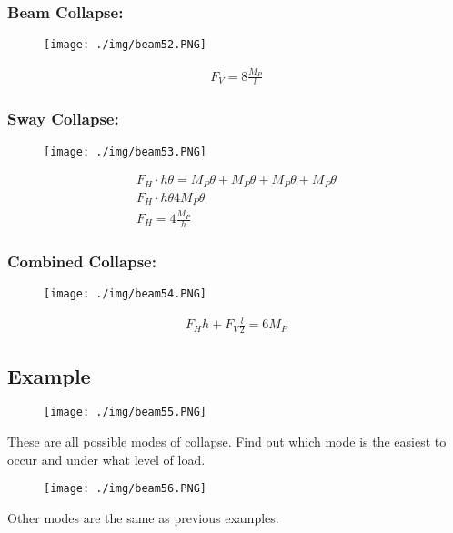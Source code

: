 \subsubsection{Beam Collapse:}
\begin{figure}[H]
  \centering
  \texttt{[image: ./img/beam52.PNG]}
\end{figure}
\begin{gather}
  F_V = 8\frac{M_P}{l}
\end{gather}
\subsubsection{Sway Collapse:}
\begin{figure}[H]
  \centering
  \texttt{[image: ./img/beam53.PNG]}
\end{figure}
\begin{gather}
  F_H \cdot h\theta = M_P\theta + M_P\theta + M_P\theta + M_P\theta \\
  F_H \cdot h\theta 4M_P\theta \\
  F_H = 4\frac{M_P}{h}
\end{gather}
\subsubsection{Combined Collapse:}
\begin{figure}[H]
  \centering
  \texttt{[image: ./img/beam54.PNG]}
\end{figure}
\begin{gather}
  F_Hh + F_V\frac{l}{2} = 6M_P
\end{gather}
\subsection*{Example}
\begin{figure}[H]
  \centering
  \texttt{[image: ./img/beam55.PNG]}
\end{figure}
These are all possible modes of collapse. Find out which mode is the easiest to occur and under what level of load.
\begin{figure}[H]
  \centering
  \texttt{[image: ./img/beam56.PNG]}
\end{figure}
Other modes are the same as previous examples.